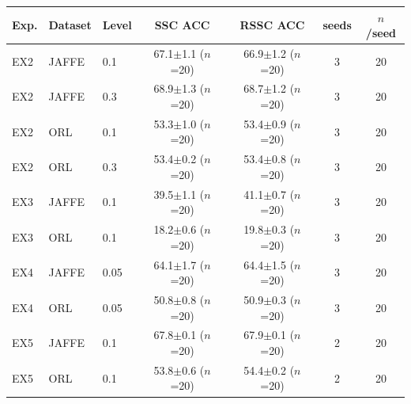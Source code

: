 \begin{tabular}{lllcccc}
\toprule
Exp. & Dataset & Level & SSC ACC & RSSC ACC & seeds & $n$/seed \\
\midrule
EX2 & JAFFE & 0.1 & 67.1$\pm$1.1 ($n$=20) & 66.9$\pm$1.2 ($n$=20) & 3 & 20 \\
EX2 & JAFFE & 0.3 & 68.9$\pm$1.3 ($n$=20) & 68.7$\pm$1.2 ($n$=20) & 3 & 20 \\
EX2 & ORL & 0.1 & 53.3$\pm$1.0 ($n$=20) & 53.4$\pm$0.9 ($n$=20) & 3 & 20 \\
EX2 & ORL & 0.3 & 53.4$\pm$0.2 ($n$=20) & 53.4$\pm$0.8 ($n$=20) & 3 & 20 \\
EX3 & JAFFE & 0.1 & 39.5$\pm$1.1 ($n$=20) & 41.1$\pm$0.7 ($n$=20) & 3 & 20 \\
EX3 & ORL & 0.1 & 18.2$\pm$0.6 ($n$=20) & 19.8$\pm$0.3 ($n$=20) & 3 & 20 \\
EX4 & JAFFE & 0.05 & 64.1$\pm$1.7 ($n$=20) & 64.4$\pm$1.5 ($n$=20) & 3 & 20 \\
EX4 & ORL & 0.05 & 50.8$\pm$0.8 ($n$=20) & 50.9$\pm$0.3 ($n$=20) & 3 & 20 \\
EX5 & JAFFE & 0.1 & 67.8$\pm$0.1 ($n$=20) & 67.9$\pm$0.1 ($n$=20) & 2 & 20 \\
EX5 & ORL & 0.1 & 53.8$\pm$0.6 ($n$=20) & 54.4$\pm$0.2 ($n$=20) & 2 & 20 \\
\bottomrule
\end{tabular}

